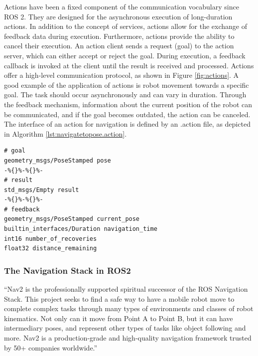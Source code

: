 Actions have been a fixed component of the communication vocabulary since ROS 2. They are designed for the asynchronous execution of long-duration actions. In addition to the concept of services, actions allow for the exchange of feedback data during execution. Furthermore, actions provide the ability to cancel their execution. An action client sends a request (goal) to the action server, which can either accept or reject the goal. During execution, a feedback callback is invoked at the client until the result is received and processed. Actions offer a high-level communication protocol, as shown in Figure \ref{fig:actions}. A good example of the application of actions is robot movement towards a specific goal. The task should occur asynchronously and can vary in duration. Through the feedback mechanism, information about the current position of the robot can be communicated, and if the goal becomes outdated, the action can be canceled. The interface of an action for navigation is defined by an .action file, as depicted in Algorithm \ref{lst:navigatetopose.action}.

\begin{lstlisting}
# goal
geometry_msgs/PoseStamped pose
-%{}%-%{}%-
# result
std_msgs/Empty result
-%{}%-%{}%-
# feedback
geometry_msgs/PoseStamped current_pose
builtin_interfaces/Duration navigation_time
int16 number_of_recoveries
float32 distance_remaining
\end{lstlisting}
    
\subsubsection{The Navigation Stack in ROS2}

\begin{displayquote}
    \enquote{Nav2 is the professionally supported spiritual successor of the ROS Navigation Stack. This project seeks to find a safe way to have a mobile robot move to complete complex tasks through many types of environments and classes of robot kinematics. Not only can it move from Point A to Point B, but it can have intermediary poses, and represent other types of tasks like object following and more. Nav2 is a production-grade and high-quality navigation framework trusted by 50+ companies worldwide.} \cite{https://navigation.ros.org/}
\end{displayquote}

